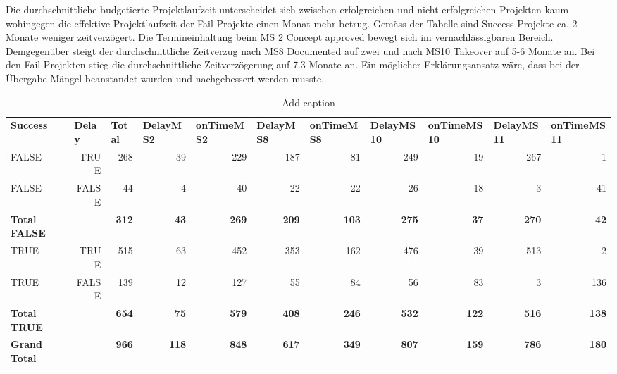 Die durchschnittliche budgetierte Projektlaufzeit unterscheidet sich zwischen erfolgreichen und  nicht-erfolgreichen Projekten kaum wohingegen die effektive Projektlaufzeit der Fail-Projekte einen Monat mehr betrug. Gemäss der Tabelle sind Success-Projekte ca. 2 Monate weniger zeitverzögert. Die Termineinhaltung beim MS 2 Concept approved bewegt sich im vernachlässigbaren Bereich. Demgegenüber steigt der durchschnittliche Zeitverzug nach MS8 Documented auf zwei und nach MS10 Takeover auf 5-6 Monate an. Bei den Fail-Projekten stieg die durchschnittliche Zeitverzögerung auf 7.3 Monate an. Ein möglicher Erklärungsansatz wäre, dass bei der Übergabe Mängel beanstandet wurden und nachgebessert werden musste.
\begin{table}[htbp]
	\centering
	\caption{Add caption}
	\begin{tabular}{lrrrrrrrrrr}
		\textbf{Success} & \multicolumn{1}{l}{\textbf{Delay}} & \multicolumn{1}{l}{\textbf{Total}} & \multicolumn{1}{l}{\textbf{DelayMS2}} & \multicolumn{1}{l}{\textbf{onTimeMS2}} & \multicolumn{1}{l}{\textbf{DelayMS8}} & \multicolumn{1}{l}{\textbf{onTimeMS8}} & \multicolumn{1}{l}{\textbf{DelayMS10}} & \multicolumn{1}{l}{\textbf{onTimeMS10}} & \multicolumn{1}{l}{\textbf{DelayMS11}} & \multicolumn{1}{l}{\textbf{onTimeMS11}} \\
		FALSE & TRUE  & 268   & 39    & 229   & 187   & 81    & 249   & 19    & 267   & 1 \\
		FALSE & FALSE & 44    & 4     & 40    & 22    & 22    & 26    & 18    & 3     & 41 \\
		\textbf{Total FALSE} &       & \textbf{312} & \textbf{43} & \textbf{269} & \textbf{209} & \textbf{103} & \textbf{275} & \textbf{37} & \textbf{270} & \textbf{42} \\
		TRUE  & TRUE  & 515   & 63    & 452   & 353   & 162   & 476   & 39    & 513   & 2 \\
		TRUE  & FALSE & 139   & 12    & 127   & 55    & 84    & 56    & 83    & 3     & 136 \\
		\textbf{Total TRUE} &       & \textbf{654} & \textbf{75} & \textbf{579} & \textbf{408} & \textbf{246} & \textbf{532} & \textbf{122} & \textbf{516} & \textbf{138} \\
		\textbf{Grand Total} &       & \textbf{966} & \textbf{118} & \textbf{848} & \textbf{617} & \textbf{349} & \textbf{807} & \textbf{159} & \textbf{786} & \textbf{180} \\
	\end{tabular}%
	\label{tab:addlabel}%
\end{table}%
